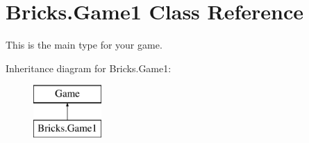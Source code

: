 \hypertarget{class_bricks_1_1_game1}{}\section{Bricks.\+Game1 Class Reference}
\label{class_bricks_1_1_game1}


This is the main type for your game.  


Inheritance diagram for Bricks.\+Game1\+:\begin{figure}[H]
\begin{center}
\leavevmode
\includegraphics[height=2.000000cm]{class_bricks_1_1_game1}
\end{center}
\end{figure}
